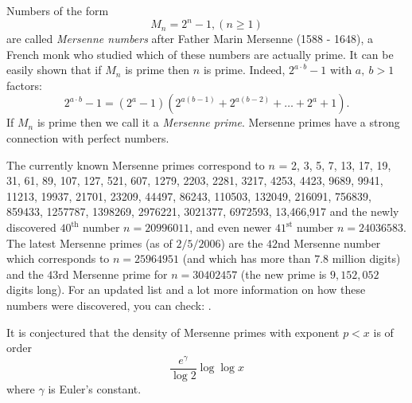 \documentclass{article}
\begin{document}
Numbers of the form
\[
M_n = 2^n - 1, (n \geq 1)
\]
are called \emph{Mersenne numbers} after Father Marin Mersenne (1588 - 1648), a French monk who studied which of these numbers are actually prime. It can be easily shown that if $M_n$ is prime then $n$ is prime. Indeed, $2^{a\cdot b}-1$ with $a,\ b >1$ factors:
$$2^{a\cdot b}-1=(2^a-1)(2^{a(b-1)}+2^{a(b-2)}+\ldots+2^a+1).$$
If $M_n$ is prime then we call it a \emph{Mersenne prime}. Mersenne primes have a strong connection with perfect numbers.

The currently known Mersenne primes correspond to $n$ = 2, 3, 5, 7, 13, 17, 19, 31, 61, 89, 107, 127, 521, 607, 1279, 2203, 2281, 3217, 4253, 4423, 9689, 9941, 11213, 19937, 21701, 23209, 44497, 86243, 110503, 132049, 216091, 756839, 859433, 1257787, 1398269, 2976221, 3021377, 6972593, 13,466,917 and the newly discovered $40^{\operatorname{th}}$ number $n=20996011$, and even newer $41^{\operatorname{st}}$ number $n=24036583$. The latest Mersenne primes (as of $2/5/2006$) are the $42$nd Mersenne number which corresponds to $n=25964951$ (and which has more than $7.8$ million digits) and the $43$rd Mersenne prime for $n=30402457$ (the new prime is $9,152,052$ digits long). For an updated list and a lot more information on how these numbers were discovered, you can check: .

It is conjectured that the density of Mersenne primes with exponent $p<x$ is of order
$$ \frac{e^{\gamma}}{\log 2} \log \log x $$
where $\gamma$ is Euler's constant.
\end{document}
